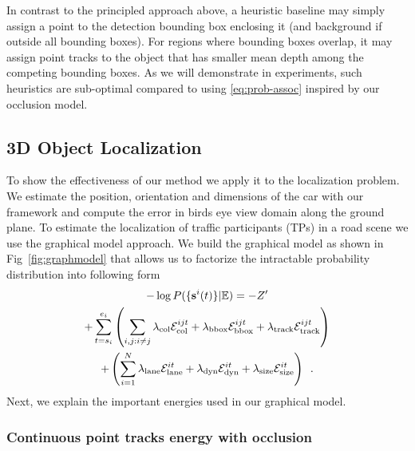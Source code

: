 In contrast to the principled approach above, a heuristic baseline may simply assign a point to the detection bounding box enclosing it (and background if outside all bounding boxes). For regions where bounding boxes overlap, it may assign point tracks to the object that has smaller mean depth among the competing bounding boxes. As we will demonstrate in experiments, such heuristics are sub-optimal compared to using \eqref{eq:prob-assoc} inspired by our occlusion model.




\subsection{3D Object Localization}
To show the effectiveness of our method we apply it to the localization
problem. We estimate the position, orientation and dimensions of the car with
our framework and compute the error in birds eye view domain along the ground
plane. 
To estimate the localization of traffic participants (TPs) in a road scene we use the graphical model approach.
We build the graphical model as shown in Fig~\ref{fig:graphmodel} that 
allows us to factorize the intractable probability distribution into following form
%
\begin{multline}
  -\log{P(\{\mathbf{s}^{i}(t)\} | \mathbb{E})} = 
  -Z' 
  \\
  + \sum_{t=s_i}^{e_i}
  \left(
  \sum_{i,j:i\ne j}   
  \lambda_{\text{col}}\mathcal{E}^{ijt}_{\text{col}} 
   + \lambda_{\text{bbox}}\mathcal{E}^{ijt}_{\text{bbox}}
   + \lambda_{\text{track}}\mathcal{E}^{ijt}_{\text{track}}
\right)
  \\
  + \left(
  \sum_{i=1}^N 
  \lambda_{\text{lane}}\mathcal{E}^{it}_{\text{lane}}
  + \lambda_{\text{dyn}}\mathcal{E}^{it}_{\text{dyn}}
  + \lambda_{\text{size}}\mathcal{E}^{it}_{\text{size}}
\right)
  \enspace.
\end{multline}
%
Next, we explain the important energies used in our graphical model.

\subsubsection{Continuous point tracks energy with occlusion}
\label{sec:totalContPtTracksEnergy}

